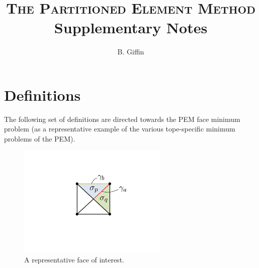 \documentclass[11pt]{article} %
\title{\textsc{The Partitioned Element Method} \\ \textbf{Supplementary Notes}}
\author{B. Giffin}
\date{}
\begin{document}
\maketitle

\section{Definitions}
The following set of definitions are directed towards the PEM face minimum problem (as a representative example of the various tope-specific minimum problems of the PEM).
\begin{figure} [!ht]
	\centering
	\includegraphics[width = 2.8in,trim=170 190 170 120,clip=true]{facetMinImage.pdf}
	\caption{A representative face of interest.}
	\label{fig:facetMin}
\end{figure}
\end{document}
